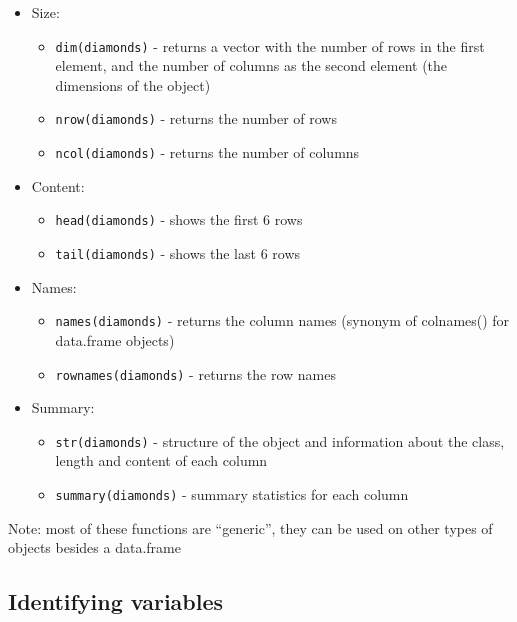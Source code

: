 \documentclass[
]{article}
\providecommand{\tightlist}{%
  \setlength{\itemsep}{0pt}\setlength{\parskip}{0pt}}
\begin{document}
\begin{itemize}
\tightlist
\item
  Size:

  \begin{itemize}
  \tightlist
  \item
    \texttt{dim(diamonds)} - returns a vector with the number of rows in
    the first element, and the number of columns as the second element
    (the dimensions of the object)
  \item
    \texttt{nrow(diamonds)} - returns the number of rows
  \item
    \texttt{ncol(diamonds)} - returns the number of columns
  \end{itemize}
\item
  Content:

  \begin{itemize}
  \tightlist
  \item
    \texttt{head(diamonds)} - shows the first 6 rows
  \item
    \texttt{tail(diamonds)} - shows the last 6 rows
  \end{itemize}
\item
  Names:

  \begin{itemize}
  \tightlist
  \item
    \texttt{names(diamonds)} - returns the column names (synonym of
    colnames() for data.frame objects)
  \item
    \texttt{rownames(diamonds)} - returns the row names
  \end{itemize}
\item
  Summary:

  \begin{itemize}
  \tightlist
  \item
    \texttt{str(diamonds)} - structure of the object and information
    about the class, length and content of each column
  \item
    \texttt{summary(diamonds)} - summary statistics for each column
  \end{itemize}
\end{itemize}

Note: most of these functions are ``generic'', they can be used on other
types of objects besides a data.frame

\hypertarget{identifying-variables}{%
\subsection{Identifying variables}\label{identifying-variables}}
\end{document}
